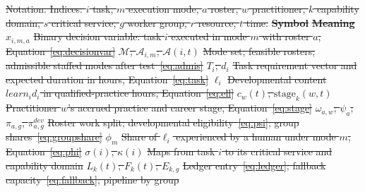 \documentclass[utf8]{FrontiersinHarvard}
\providecommand{\DIFdel}[1]{{\protect\color{red}\sout{#1}}}                      %
\providecommand{\DIFdelFL}[1]{\DIFdel{#1}} %
\begin{document}
{%
\DIFdelFL{Notation. Indices: $i$ task, $m$ execution mode, $a$ roster, $w$ practitioner, $k$ capability domain, $s$ critical service, $g$ worker group, $r$ resource, $t$ time.}}
\textbf{\DIFdelFL{Symbol}} %
\textbf{\DIFdelFL{Meaning}}%
\DIFdelFL{$x_{i,m,a}$ }%
\DIFdelFL{Binary decision variable: task $i$ executed in mode $m$ with roster $a$, Equation~\eqref{eq:decisionvar}}%
\DIFdelFL{$\mathcal{M}$; $\mathcal{A}_{i,m}$; $\mathcal{A}(i,t)$ }%
\DIFdelFL{Mode set; feasible rosters; admissible staffed modes after test~\eqref{eq:admis}}%
\DIFdelFL{$T_i$; $d_i$ }%
\DIFdelFL{Task requirement vector and expected duration in hours, Equation~\eqref{eq:task}}%
\DIFdelFL{$\ell_i$ }%
\DIFdelFL{Developmental content $learn_i d_i$ in qualified-practice hours, Equation~\eqref{eq:ell}}%
\DIFdelFL{$c_w(t)$; $\mathrm{stage}_k(w,t)$ }%
\DIFdelFL{Practitioner $w$'s accrued practice and career stage, Equation~\eqref{eq:stage}}%
\DIFdelFL{$\omega_{a,w}$; $\psi_a$; $\pi_{a,g}$, $\pi^{dev}_{a,g}$ }%
\DIFdelFL{Roster work split; developmental eligibility~\eqref{eq:psi}; group shares~\eqref{eq:groupshare}}%
\DIFdelFL{$\phi_m$ }%
\DIFdelFL{Share of $\ell_i$ experienced by a human under mode $m$, Equation~\eqref{eq:phi}}%
\DIFdelFL{$\sigma(i)$, $\kappa(i)$ }%
\DIFdelFL{Maps from task $i$ to its critical service and capability domain}%
\DIFdelFL{$L_k(t)$; $F_k(t)$; $E_{k,g}$ }%
\DIFdelFL{Ledger entry~\eqref{eq:ledger}; fallback capacity~\eqref{eq:fallback}; pipeline by group}%
\end{document}
